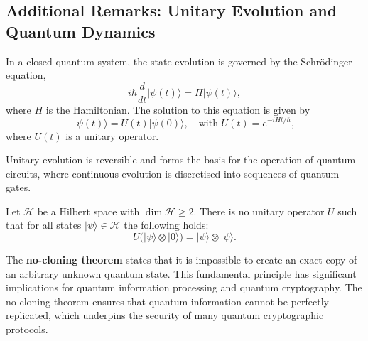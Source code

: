 
\subsection{Additional Remarks: Unitary Evolution and Quantum Dynamics}
\label{subsec:unitary_evolution}

\begin{definition}
In a closed quantum system, the state evolution is governed by the Schrödinger equation,
\[
i\hbar \frac{d}{dt} |\psi(t)\rangle = H |\psi(t)\rangle,
\]
where \(H\) is the Hamiltonian. The solution to this equation is given by
\[
|\psi(t)\rangle = U(t)|\psi(0)\rangle, \quad \text{with } U(t)=e^{-iHt/\hbar},
\]
where \(U(t)\) is a unitary operator.
\end{definition}

\begin{remark}
Unitary evolution is reversible and forms the basis for the operation of quantum circuits, where continuous evolution is discretised into sequences of quantum gates.
\end{remark}

\begin{theorem}
    Let \(\mathcal{H}\) be a Hilbert space with \(\dim \mathcal{H} \ge 2\). There is no unitary operator \(U\) such that for all states \(|\psi\rangle \in \mathcal{H}\) the following holds:
    \[
    U\big(|\psi\rangle \otimes |0\rangle\big) = |\psi\rangle \otimes |\psi\rangle.
    \]
\end{theorem}

\begin{observation}
    The \textbf{no-cloning theorem} states that it is impossible to create an exact copy of an arbitrary unknown quantum state. This fundamental principle has significant implications for quantum information processing and quantum cryptography.
    The no-cloning theorem ensures that quantum information cannot be perfectly replicated, which underpins the security of many quantum cryptographic protocols.
\end{observation}